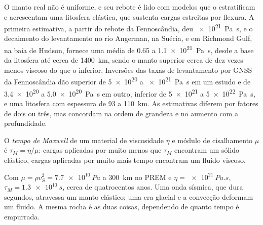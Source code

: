 O manto real não é uniforme, e seu rebote é lido com modelos que o estratificam
e acrescentam uma litosfera elástica, que sustenta cargas estreitas por flexura. A
primeira estimativa, a partir do rebote da Fennoscândia, deu \qty{e21}{Pa.s}, e o
decaimento do levantamento no rio Angerman, na Suécia, e em Richmond Gulf, na baía de Hudson,
fornece uma média de 0.65 a \qty{1.1e21}{Pa.s}, desde a base da
litosfera até cerca de \qty{1400}{km}, sendo o manto superior cerca de dez vezes
menos viscoso do que o inferior. Inversões das taxas de levantamento por GNSS da
Fennoscândia dão  superior de \num{5e20} a \qty{e21}{Pa.s}
em um estudo e de \num{3.4e20} a \qty{5.0e20}{Pa.s} em outro,  inferior
de \num{5e21} a \qty{5e22}{Pa.s}, e uma litosfera com espessura de 93 a
\qty{110}{km}. As estimativas diferem por fatores de dois ou três, mas concordam
na ordem de grandeza e no aumento com a profundidade.

\begin{definition}\label{def:b3:mantle-convection:maxwell}
O \emph{tempo de Maxwell} de um material de viscosidade $\eta$
e módulo de cisalhamento $\mu$ é $\tau_M = \eta/\mu$: cargas aplicadas por muito menos que
$\tau_M$ encontram um sólido elástico, cargas aplicadas por muito mais tempo encontram um fluido viscoso.
\end{definition}

Com $\mu = \rho v_S^2 = \qty{7.7e10}{Pa}$ a \qty{300}{km} no PREM e $\eta =
\qty{e21}{Pa.s}$, $\tau_M = \qty{1.3e10}{s}$, cerca de quatrocentos anos. Uma
onda sísmica, que dura segundos, atravessa um manto elástico; uma era glacial e
a convecção deformam um fluido. A mesma rocha é as duas coisas, dependendo de
quanto tempo é empurrada.

